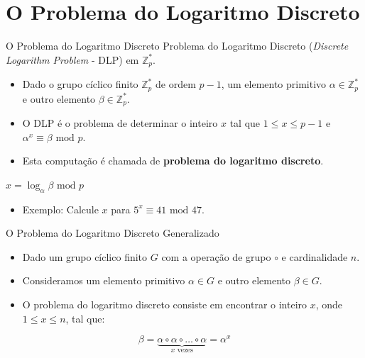 \documentclass{beamer}
\begin{document}
\section{O Problema do Logaritmo Discreto}
\begin{frame}{O Problema do Logaritmo Discreto}
    \small Problema do Logaritmo Discreto (\textit{Discrete Logarithm Problem} - DLP) em $\mathbb{Z}_p^*$.
    \normalsize
    \begin{itemize}
        \item Dado o grupo cíclico finito $\mathbb{Z}_p^*$ de ordem $p-1$, um elemento primitivo $\alpha \in \mathbb{Z}_p^*$ e outro elemento $\beta \in \mathbb{Z}_p^*$.
        \item O DLP é o problema de determinar o inteiro $x$ tal que $1 \le x \le p-1$ e $\alpha^x \equiv \beta \text{ mod } p$.
        \item Esta computação é chamada de \textbf{problema do logaritmo discreto}.
    \end{itemize}

    \begin{center}
    $x = \log_{\alpha} \beta \text{ mod } p$
    \end{center}

    \begin{itemize}
        \item Exemplo: Calcule $x$ para $5^x \equiv 41 \text{ mod } 47$.
    \end{itemize}
\end{frame}

\begin{frame}{O Problema do Logaritmo Discreto Generalizado}
    \begin{itemize}
        \item Dado um grupo cíclico finito $G$ com a operação de grupo $\circ$ e cardinalidade $n$.
        \vspace{0.5em}
        \item Consideramos um elemento primitivo $\alpha \in G$ e outro elemento $\beta \in G$.
        \vspace{0.5em}
        \item O problema do logaritmo discreto consiste em encontrar o inteiro $x$, onde $1 \le x \le n$, tal que:
    \end{itemize}
    \[
        \beta = \underbrace{\alpha \circ \alpha \circ \ldots \circ \alpha}_{x \text{ vezes}} = \alpha^x
    \]
\end{frame}
\end{document}
